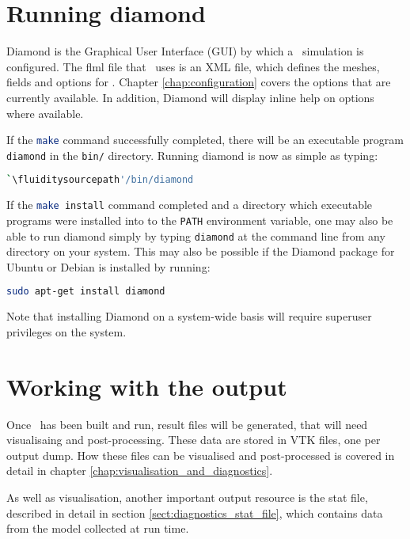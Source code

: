 \section{Running diamond}
\label{sect:running_diamond}

Diamond is the Graphical User Interface (GUI) by which a \fluidity\ simulation is 
configured. The flml file that \fluidity\ uses is an XML file, which defines the
meshes, fields and options for \fluidity. Chapter \ref{chap:configuration} covers 
the options that are currently available. In addition, Diamond will display inline
help on options where available.

If the \lstinline[language=Bash]+make+ command successfully completed, there will be an
executable program \lstinline[language=Bash]+diamond+ in the
\lstinline[language=Bash]+bin/+ directory. Running diamond is now as simple as
typing:

\begin{lstlisting}[language=Bash]
`\fluiditysourcepath'/bin/diamond
\end{lstlisting}

If the \lstinline[language=Bash]+make install+ command completed and a directory
which executable programs were installed into to the
\lstinline[language=Bash]+PATH+ environment variable, one may also be able to run
diamond simply by typing \lstinline[language=Bash]+diamond+ at the command line
from any directory on your system. This may also be possible if the
Diamond package for Ubuntu or Debian is installed by running:

\begin{lstlisting}[language=Bash]
sudo apt-get install diamond
\end{lstlisting}

Note that installing Diamond on a system-wide basis will require superuser privileges on the system.

\section{Working with the output}
\label{sect:working_with_output}

Once \fluidity\ has been built and run, result files will be generated, that will need visualisaing
and post-processing. These data are stored in VTK files, one per output dump. 
How these files can be visualised and post-processed is covered in detail in chapter
\ref{chap:visualisation_and_diagnostics}.

As well as visualisation, another important output resource is the stat file,
described in detail in section \ref{sect:diagnostics_stat_file}, which contains data from the model
collected at run time.

\website



